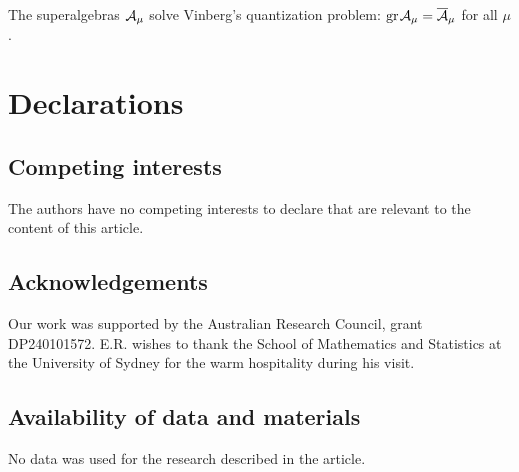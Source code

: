 \documentclass[12pt]{article}
\begin{document}
\bcj\label{conj:mfa}
The superalgebras ${\mathcal A}_{\mu}$ solve Vinberg's quantization problem:
${\rm gr}\hspace{1pt}{\mathcal A}_{\mu}=\overline{{\mathcal A}}_{\mu}$ for all $\mu$.
\ecj



\section*{Declarations}

\subsection*{Competing interests}
The authors have no competing interests to declare that are relevant to the content of this article.

\subsection*{Acknowledgements}
Our work was supported by the Australian Research Council, grant DP240101572.
E.R. wishes to thank the School of Mathematics and Statistics
at the University of Sydney
for the warm hospitality during his visit.


\subsection*{Availability of data and materials}
No data was used for the research described in the article.
\end{document}
